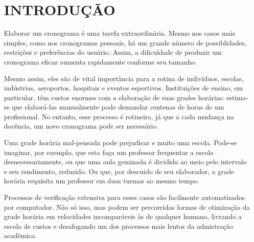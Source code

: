 \documentclass[12pt,a4paper]{article}
\begin{document}
	\newpage


	\section{INTRODUÇÃO}



		\par Elaborar um cronograma é uma tarefa extraordinária. Mesmo nos casos mais simples, como nos cronogramas pessoais, há um grande número de possiblidades, restrições e preferências do usuário. Assim, a dificuldade de produzir um cronograma eficaz aumenta rapidamente conforme seu tamanho.

		\par Mesmo assim, eles são de vital importância para a rotina de indivíduos, escolas, indústrias, aeroportos, hospitais e eventos esportivos. Instituições de ensino, em particular, têm custos enormes com a elaboração de suas grades horárias: estima-se que elaborá-las manualmente pode demandar centenas de horas \cite{appleby} de um profissional. No entanto, esse processo é rotineiro, já que a cada mudança na docência, um novo cronograma pode ser necessário.

		\par Uma grade horária mal-pensada pode prejudicar e muito uma escola. Pode-se imaginar, por exemplo, que esta faça um professor frequentar a escola desnecessariamente, ou que uma aula geminada é dividida ao meio pelo intervalo e seu rendimento, reduzido. Ou que, por descuido de seu elaborador, a grade horária requisita um professor em duas turmas ao mesmo tempo.

		\par Processos de verificação extensiva para esses casos são facilmente automatizados por computador. Não só isso, mas podem ser percorridas formas de otimização da grade horária em velocidades incomparáveis às de qualquer humano, livrando a escola de custos e desafogando um dos processos mais lentos da admistração acadêmica.

\end{document}
